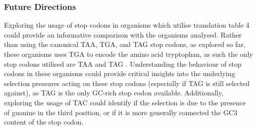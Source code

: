 \documentclass[../main.tex]{subfile}
\begin{document}
    \subsubsection{Future Directions}
        Exploring the usage of stop codons in organisms which utilise translation table 4 could provide an informative comparison with the organisms analysed. Rather than using the canonical TAA, TGA, and TAG stop codons, as explored so far, these organisms uses TGA to encode the amino acid tryptophan, as such the only stop codons utilised are TAA and TAG \autocite{translationTable}. Understanding the behaviour of stop codons in these organisms could provide critical insights into the underlying selection pressures acting on these stop codons (especially if TAG is still selected against), as TAG is the only GC-rich stop codon available. Additionally, exploring the usage of TAC could identify if the selection is due to the presence of guanine in the third position, or if it is more generally connected the GC3 content of the stop codon.







\end{document}
